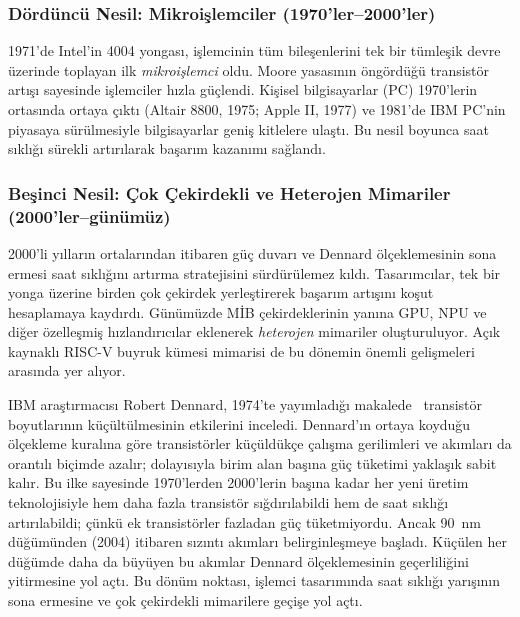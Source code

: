 \subsubsection*{Dördüncü Nesil: Mikroişlemciler (1970'ler--2000'ler)}
1971'de Intel'in 4004 yongası, işlemcinin tüm bileşenlerini tek bir tümleşik devre üzerinde toplayan ilk \emph{mikroişlemci} oldu. Moore yasasının öngördüğü transistör artışı sayesinde işlemciler hızla güçlendi. Kişisel bilgisayarlar (PC) 1970'lerin ortasında ortaya çıktı (Altair 8800, 1975; Apple II, 1977) ve 1981'de IBM PC'nin piyasaya sürülmesiyle bilgisayarlar geniş kitlelere ulaştı. Bu nesil boyunca saat sıklığı sürekli artırılarak başarım kazanımı sağlandı.

\subsubsection*{Beşinci Nesil: Çok Çekirdekli ve Heterojen Mimariler (2000'ler--günümüz)}
2000'li yılların ortalarından itibaren güç duvarı ve Dennard ölçeklemesinin sona ermesi saat sıklığını artırma stratejisini sürdürülemez kıldı. Tasarımcılar, tek bir yonga üzerine birden çok çekirdek yerleştirerek başarım artışını koşut hesaplamaya kaydırdı. Günümüzde MİB çekirdeklerinin yanına GPU, NPU ve diğer özelleşmiş hızlandırıcılar eklenerek \emph{heterojen} mimariler oluşturuluyor. Açık kaynaklı RISC-V buyruk kümesi mimarisi de bu dönemin önemli gelişmeleri arasında yer alıyor.

\begin{bilginot}
IBM araştırmacısı Robert Dennard, 1974'te yayımladığı makalede~\cite{dennard1974} transistör boyutlarının küçültülmesinin etkilerini inceledi. Dennard'ın ortaya koyduğu ölçekleme kuralına göre transistörler küçüldükçe çalışma gerilimleri ve akımları da orantılı biçimde azalır; dolayısıyla birim alan başına güç tüketimi yaklaşık sabit kalır. Bu ilke sayesinde 1970'lerden 2000'lerin başına kadar her yeni üretim teknolojisiyle hem daha fazla transistör sığdırılabildi hem de saat sıklığı artırılabildi; çünkü ek transistörler fazladan güç tüketmiyordu. Ancak 90~nm düğümünden (2004) itibaren sızıntı akımları belirginleşmeye başladı. Küçülen her düğümde daha da büyüyen bu akımlar Dennard ölçeklemesinin geçerliliğini yitirmesine yol açtı. Bu dönüm noktası, işlemci tasarımında saat sıklığı yarışının sona ermesine ve çok çekirdekli mimarilere geçişe yol açtı.
\end{bilginot}

